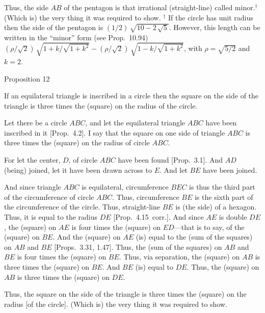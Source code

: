 Thus, the side $AB$ of the pentagon is that irrational (straight-line)
called minor.$^\dag$ (Which is) the very thing it was required to show.
{\footnotesize\noindent$^\dag$ If the circle has unit radius then the side of the pentagon is $(1/2)\,\sqrt{10-2\,\sqrt{5}}$. However, this length can
be written in the ``minor'' form (see Prop.~10.94) $(\rho/\sqrt{2})\,\sqrt{1+k/\sqrt{1+k^2}} - (\rho/\sqrt{2})\,\sqrt{1-k/\sqrt{1+k^2}}$, with $\rho=\sqrt{5/2}$ and $k=2$.}


\begin{center}
{\large Proposition 12}
\end{center}

If an equilateral triangle is inscribed in a circle then the
square on the side of the triangle is three times the (square) on
the radius of the circle.

Let there be a circle $ABC$, and let the equilateral triangle $ABC$ have
been inscribed in it  [Prop.~4.2]. I say that the square on one side of triangle
$ABC$ is three times the (square) on the radius of circle $ABC$. 

\epsfysize=2.5in
\centerline{}

For let the center, $D$, of circle $ABC$ have been found [Prop.~3.1].
And  $AD$ (being) joined, let it have been drawn across to $E$. 
And let $BE$ have been joined.

And since triangle $ABC$ is equilateral, circumference $BEC$ is thus the
third part of the circumference of circle $ABC$. Thus, 
circumference $BE$ is the sixth part of the circumference of the circle. 
Thus, straight-line $BE$ is (the side) of a hexagon. Thus, it is equal to the radius
$DE$ [Prop.~4.15~corr.]. And since $AE$ is double $DE$, the (square)
on $AE$ is four times the (square) on $ED$---that is to say, of the
(square) on $BE$.  And the (square) on $AE$ (is) equal to
the (sum of the squares) on $AB$ and $BE$ [Props.~3.31, 1.47]. 
Thus, the (sum of the squares) on $AB$ and $BE$ is four times the
(square) on $BE$. Thus, via separation, the (square) on $AB$ is three
times the (square) on $BE$. And $BE$ (is) equal to $DE$. Thus, the
(square) on $AB$ is three times the (square) on $DE$.

Thus, the square on the side of the triangle is three times the (square)
on the radius [of the circle]. (Which is) the very thing it was required to show.


